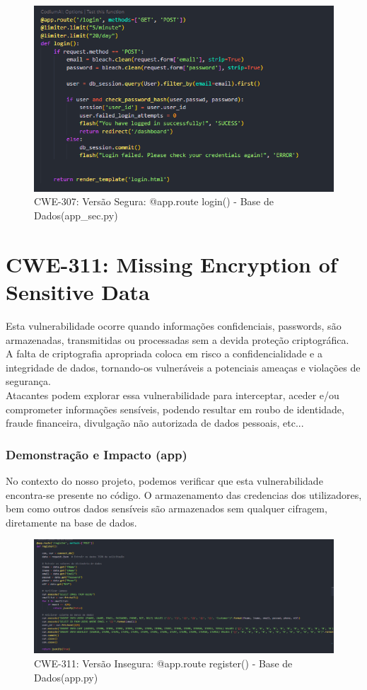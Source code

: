 \begin{figure}[H]
  \centering
  \includegraphics[width=0.8\linewidth]{images/CWE307-safe2-sec_app.png}
  \caption{CWE-307: Versão Segura: @app.route login() - Base de Dados(app\_sec.py)}
  \label{fig:cwe307-safe2-sec_app}
\end{figure}
%
%
\section{CWE-311: Missing Encryption of Sensitive Data}
\label{sec.cwe311}
Esta vulnerabilidade ocorre quando informações confidenciais, passwords, são armazenadas, transmitidas ou processadas sem a devida proteção criptográfica. \\
A falta de criptografia apropriada coloca em risco a confidencialidade e a integridade de dados, tornando-os vulneráveis a potenciais ameaças e violações de segurança. \\ 
Atacantes podem explorar essa vulnerabilidade para interceptar, aceder e/ou comprometer informações sensíveis, podendo resultar em roubo de identidade, fraude financeira, divulgação não autorizada de dados pessoais, etc...

\subsubsection{Demonstração e Impacto (app)}

No contexto do nosso projeto, podemos verificar que esta vulnerabilidade encontra-se presente no código.
O armazenamento das credencias dos utilizadores, bem como outros dados sensíveis são armazenados sem qualquer cifragem, diretamente na base de dados. 

\begin{figure}[H]
  \centering
  \includegraphics[width=16cm]{images/CWE-311-Register.png}
  \caption{CWE-311: Versão Insegura: @app.route register() - Base de Dados(app.py)}
  \label{fig:cwe311-register}
\end{figure}

